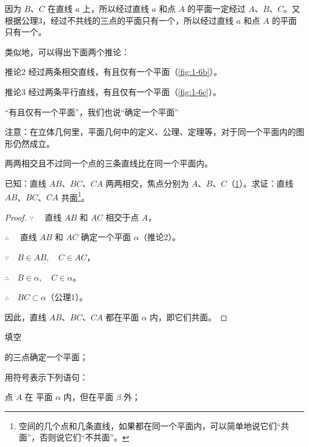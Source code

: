 因为 $B$、$C$ 在直线 $a$ 上，所以经过直线 $a$ 和点 $A$ 的平面一定经过 $A$、$B$、$C$。又根据公理3，经过不共线的三点的平面只有一个，所以经过直线 $a$ 和点 $A$ 的平面只有一个。

类似地，可以得出下面两个推论：
\begin{Deduction}{推论2}
  经过两条相交直线，有且仅有一个平面（\cref{fig:1-6b}）。
\end{Deduction}
\begin{Deduction}{推论3}
  经过两条平行直线，有且仅有一个平面（\cref{fig:1-6c}）。
\end{Deduction}

“有且仅有一个平面”，我们也说“确定一个平面”

注意：在立体几何里，平面几何中的定义、公理、定理等，对于同一个平面内的图形仍然成立。

\begin{example}
  两两相交且不过同一个点的三条直线比在同一个平面内。

  已知：直线 $AB$、$BC$、$CA$ 两两相交，焦点分别为 $A$、$B$、$C$（\cref{fig:1-7}）。求证：直线 $AB$、$BC$、$CA$ 共面\footnote{空间的几个点和几条直线，如果都在同一个平面内，可以简单地说它们“共面”，否则说它们“不共面”。}。
\end{example}

\begin{proof}
  $\because\quad$ 直线 $AB$ 和 $AC$ 相交于点 $A$，

  $\therefore\quad$ 直线 $AB$ 和 $AC$ 确定一个平面 $\alpha$（推论2）。

  $\because\quad B\in AB,\quad C\in AC$，

  $\therefore\quad B\in \alpha,\quad C\in \alpha$。

  $\therefore\quad BC\subset \alpha$（公理1）。

  因此，直线 $AB$、$BC$、$CA$ 都在平面 $\alpha$ 内，即它们共面。
\end{proof}

\begin{figure}
  \caption{}\label{fig:1-7}
\end{figure}

\begin{Practice}
  \begin{question}
    \item 填空
    \begin{tasks}
      \task {}的三点确定一个平面；
      \task 
      \task 
    \end{tasks}
    \item 用符号表示下列语句：
    \begin{tasks}
      \task 点 $A$ 在 平面 $\alpha$ 内，但在平面 $\beta$ 外；
      \task 
      \task 
      \task 
    \end{tasks}
    \item 
  \end{question}
\end{Practice}

